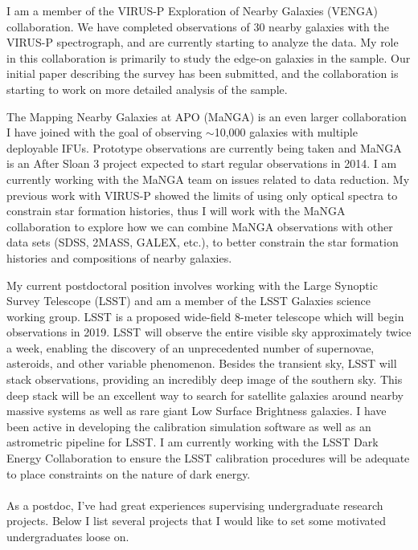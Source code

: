 \documentclass[letterpaper, 11pt]{article}
\begin{document}
I am a member of the VIRUS-P Exploration of Nearby Galaxies (VENGA) collaboration.  We have completed observations of 30 nearby galaxies with the VIRUS-P spectrograph, and are currently starting to analyze the data.  My role in this collaboration is primarily to study the edge-on galaxies in the sample.  Our initial paper describing the survey has been submitted, and the collaboration is starting to work on more detailed analysis of the sample.

The Mapping Nearby Galaxies at APO (MaNGA) is an even larger collaboration I have joined with the goal of observing $\sim$10,000 galaxies with multiple deployable IFUs.  Prototype observations are currently being taken and MaNGA is an After Sloan 3 project expected to start regular observations in 2014.  I am currently working with the MaNGA team on issues related to data reduction.  My previous work with VIRUS-P showed the limits of using only optical spectra to constrain star formation histories, thus I will work with the MaNGA collaboration to explore how we can combine MaNGA observations with other data sets (SDSS, 2MASS, GALEX, etc.), to better constrain the star formation histories and compositions of nearby galaxies.

My current postdoctoral position involves working with the Large Synoptic Survey Telescope (LSST) and am a member of the LSST Galaxies science working group.  LSST is a proposed wide-field 8-meter telescope which will begin observations in 2019.  LSST will observe the entire visible sky approximately twice a week, enabling the discovery of an unprecedented number of supernovae, asteroids, and other variable phenomenon.  Besides the transient sky, LSST will stack observations, providing an incredibly deep image of the southern sky.  This deep stack will be an excellent way to search for satellite galaxies around nearby massive systems as well as rare giant Low Surface Brightness galaxies.  I have been active in developing the calibration simulation software as well as an astrometric pipeline for LSST.  I am currently working with the LSST Dark Energy Collaboration to ensure the LSST calibration procedures will be adequate to place constraints on the nature of dark energy.  \\

\\
As a postdoc, I've had great experiences supervising undergraduate research projects.  Below I list several projects that I would like to set some motivated undergraduates loose on.
\end{document}
